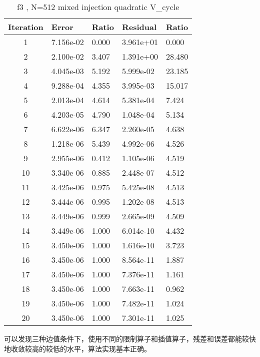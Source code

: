\documentclass[12]{article}%
\begin{document}
    \begin{table}[H]
        \centering
        \caption{f3 , N=512  mixed injection quadratic V\_cycle}
        \begin{tabular}{|c|l|l|l|l|}
        \hline
        Iteration & Error       & Ratio     & Residual    & Ratio     \\ \hline
        1 & 7.156e-02 & 0.000 & 3.961e+01 & 0.000\\ \hline 
        2 & 2.100e-02 & 3.407 & 1.391e+00 & 28.480\\ \hline 
        3 & 4.045e-03 & 5.192 & 5.999e-02 & 23.185\\ \hline 
        4 & 9.288e-04 & 4.355 & 3.995e-03 & 15.017\\ \hline 
        5 & 2.013e-04 & 4.614 & 5.381e-04 & 7.424\\ \hline 
        6 & 4.203e-05 & 4.790 & 1.048e-04 & 5.134\\ \hline 
        7 & 6.622e-06 & 6.347 & 2.260e-05 & 4.638\\ \hline 
        8 & 1.218e-06 & 5.439 & 4.992e-06 & 4.526\\ \hline 
        9 & 2.955e-06 & 0.412 & 1.105e-06 & 4.519\\ \hline 
        10 & 3.340e-06 & 0.885 & 2.448e-07 & 4.512\\ \hline 
        11 & 3.425e-06 & 0.975 & 5.425e-08 & 4.513\\ \hline 
        12 & 3.444e-06 & 0.995 & 1.202e-08 & 4.513\\ \hline 
        13 & 3.449e-06 & 0.999 & 2.665e-09 & 4.509\\ \hline 
        14 & 3.449e-06 & 1.000 & 6.014e-10 & 4.432\\ \hline 
        15 & 3.450e-06 & 1.000 & 1.616e-10 & 3.723\\ \hline 
        16 & 3.450e-06 & 1.000 & 8.564e-11 & 1.887\\ \hline 
        17 & 3.450e-06 & 1.000 & 7.376e-11 & 1.161\\ \hline 
        18 & 3.450e-06 & 1.000 & 7.663e-11 & 0.962\\ \hline 
        19 & 3.450e-06 & 1.000 & 7.482e-11 & 1.024\\ \hline 
        20 & 3.450e-06 & 1.000 & 7.301e-11 & 1.025\\ \hline       \end{tabular}
    \end{table}

可以发现三种边值条件下，使用不同的限制算子和插值算子，残差和误差都能较快地收敛较高的较低的水平，算法实现基本正确。
\subsubsection{}
\end{document}
